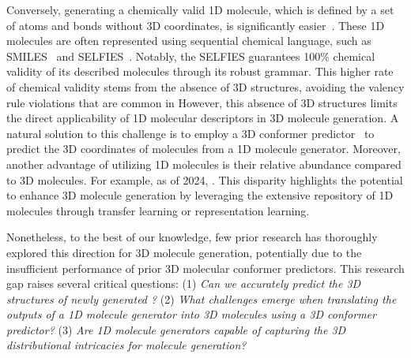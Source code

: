 Conversely, generating a chemically valid 1D molecule, which is defined by a set of atoms and bonds without 3D coordinates, is significantly easier~\citep{moses}. These 1D molecules are often represented using sequential chemical language, such as SMILES~\citep{SMILES} and SELFIES~\citep{SELFIES}. Notably, the SELFIES guarantees 100\% chemical validity of its described molecules through its robust grammar. This higher rate of chemical validity stems from the absence of 3D structures, avoiding the valency rule violations that are common in 
However, this absence of 3D structures limits the direct applicability of 1D molecular descriptors in 3D molecule generation.
A natural solution to this challenge is to employ a 3D conformer predictor~\citep{torsion} to predict the 3D coordinates of molecules from a 1D molecule generator. Moreover, another advantage of utilizing 1D molecules is their relative abundance compared to 3D molecules. For example, as of 2024, . This disparity highlights the potential to enhance 3D molecule generation by leveraging the extensive repository of 1D molecules through transfer learning or representation learning.

Nonetheless, to the best of our knowledge, few prior research has thoroughly explored this direction for 3D molecule generation, potentially due to the insufficient performance of prior 3D molecular conformer predictors. This research gap raises several critical questions: (1) \textit{Can we accurately predict the 3D structures of newly generated ?} (2) \textit{What challenges emerge when translating the outputs of a 1D molecule generator into 3D molecules using a 3D conformer predictor?} (3) \textit{Are 1D molecule generators capable of capturing the 3D distributional intricacies for molecule generation?}



